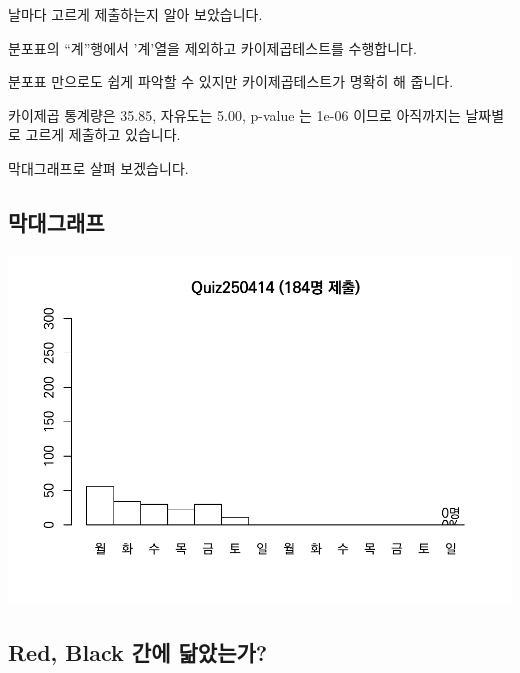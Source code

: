 \documentclass[
]{book}
\begin{document}
날마다 고르게 제출하는지 알아 보았습니다.

분포표의 ``계''행에서 '계'열을 제외하고 카이제곱테스트를 수행합니다.

분포표 만으로도 쉽게 파악할 수 있지만 카이제곱테스트가 명확히 해 줍니다.

카이제곱 통계량은 35.85, 자유도는 5.00, p-value 는 1e-06 이므로 아직까지는 날짜별로 고르게 제출하고 있습니다.

막대그래프로 살펴 보겠습니다.

\subsection{막대그래프}\label{uxb9c9uxb300uxadf8uxb798uxd504-7}

\includegraphics{_main_files/figure-latex/unnamed-chunk-210-1.pdf}

\subsection{Red, Black 간에 닮았는가?}\label{red-black-uxac04uxc5d0-uxb2eeuxc558uxb294uxac00-6}
\end{document}

